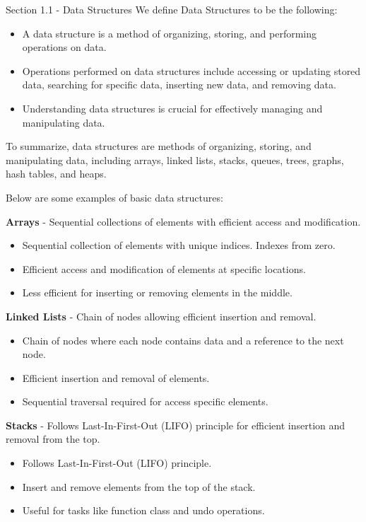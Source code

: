 \begin{notes}{Section 1.1 - Data Structures}
    We define Data Structures to be the following:

    \begin{itemize}
        \item A data structure is a method of organizing, storing, and performing operations on data.
        \item Operations performed on data structures include accessing or updating stored data, searching for specific data, inserting new data, and removing data.
        \item Understanding data structures is crucial for effectively managing and manipulating data.
    \end{itemize}
    To summarize, data structures are methods of organizing, storing, and manipulating data, including arrays, linked lists, stacks, queues, trees, graphs, hash tables,
    and heaps.
    
    \begin{highlight}
        Below are some examples of basic data structures:
    
        \textbf{Arrays} - Sequential collections of elements with efficient access and modification.
        \begin{itemize}
            \item Sequential collection of elements with unique indices. Indexes from zero.
            \item Efficient access and modification of elements at specific locations.
            \item Less efficient for inserting or removing elements in the middle.
        \end{itemize}
    
        \textbf{Linked Lists} - Chain of nodes allowing efficient insertion and removal.
        \begin{itemize}
            \item Chain of nodes where each node contains data and a reference to the next node.
            \item Efficient insertion and removal of elements.
            \item Sequential traversal required for access specific elements.
        \end{itemize}
    
        \textbf{Stacks} - Follows Last-In-First-Out (LIFO) principle for efficient insertion and removal from the top.
        \begin{itemize}
            \item Follows Last-In-First-Out (LIFO) principle.
            \item Insert and remove elements from the top of the stack.
            \item Useful for tasks like function class and undo operations.
        \end{itemize}
    

\end{highlight}
\end{notes}
